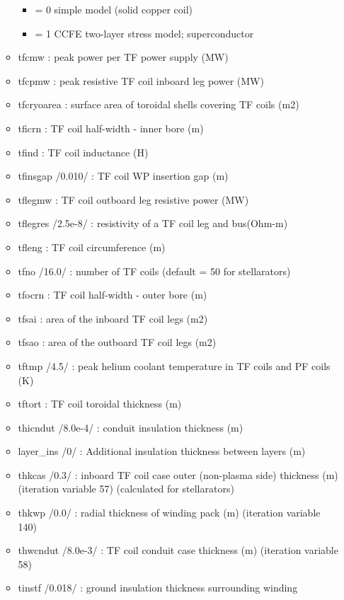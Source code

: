 \documentclass[]{article}
\providecommand{\tightlist}{%
  \setlength{\itemsep}{0pt}\setlength{\parskip}{0pt}}
\begin{document}
\begin{itemize}
\begin{itemize}
    \begin{itemize}
    \tightlist
    \item
      = 0 simple model (solid copper coil)
    \item
      = 1 CCFE two-layer stress model; superconductor
    \end{itemize}
  \item
    tfcmw : peak power per TF power supply (MW)
  \item
    tfcpmw : peak resistive TF coil inboard leg power (MW)
  \item
    tfcryoarea : surface area of toroidal shells covering TF coils (m2)
  \item
    tficrn : TF coil half-width - inner bore (m)
  \item
    tfind : TF coil inductance (H)
  \item
    tfinsgap /0.010/ : TF coil WP insertion gap (m)
  \item
    tflegmw : TF coil outboard leg resistive power (MW)
  \item
    tflegres /2.5e-8/ : resistivity of a TF coil leg and bus(Ohm-m)
  \item
    tfleng : TF coil circumference (m)
  \item
    tfno /16.0/ : number of TF coils (default = 50 for stellarators)
  \item
    tfocrn : TF coil half-width - outer bore (m)
  \item
    tfsai : area of the inboard TF coil legs (m2)
  \item
    tfsao : area of the outboard TF coil legs (m2)
  \item
    tftmp /4.5/ : peak helium coolant temperature in TF coils and PF
    coils (K)
  \item
    tftort : TF coil toroidal thickness (m)
  \item
    thicndut /8.0e-4/ : conduit insulation thickness (m)
  \item
    layer\_ins /0/ : Additional insulation thickness between layers (m)
  \item
    thkcas /0.3/ : inboard TF coil case outer (non-plasma side)
    thickness (m) (iteration variable 57) (calculated for stellarators)
  \item
    thkwp /0.0/ : radial thickness of winding pack (m) (iteration
    variable 140)
  \item
    thwcndut /8.0e-3/ : TF coil conduit case thickness (m) (iteration
    variable 58)
  \item
    tinstf /0.018/ : ground insulation thickness surrounding winding

\end{itemize}
\end{itemize}
\end{document}
